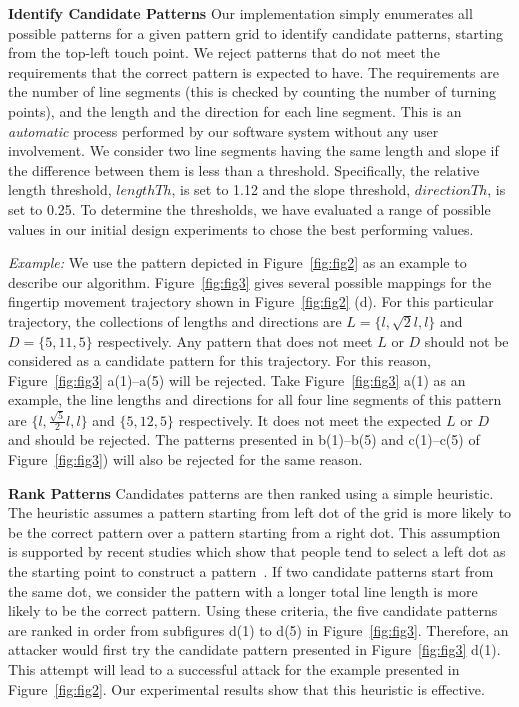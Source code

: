       \noindent \textbf{Identify Candidate Patterns} Our implementation simply enumerates all possible
        patterns for a given pattern grid to identify candidate patterns, starting from the top-left touch point.
        We reject patterns that do not meet the requirements that the correct pattern is expected to have. The requirements are the number of line segments (this is checked by counting the number of turning points), and the length and the direction for each
        line segment.
        This is an \emph{automatic} process performed by our software system without any user involvement.
       We consider two line segments having the same length and slope if the difference between them is less
       than a threshold. Specifically, the relative length threshold, $lengthTh$, is set to 1.12 and the slope threshold, $directionTh$, is set to 0.25.
       To determine the thresholds, we have evaluated a range of possible values in our initial design experiments to chose the best performing values.

       \noindent \emph{Example:} We use the pattern depicted in Figure~\ref{fig:fig2} as an example to
       describe our algorithm. Figure~\ref{fig:fig3} gives several
       possible mappings for the fingertip movement trajectory shown in Figure~\ref{fig:fig2} (d). For this particular trajectory, the collections of lengths and directions are
       $L=\{l, \sqrt{2}l, l\}$ and $D=\{5, 11, 5\}$ respectively. Any pattern that does not meet $L$ or $D$ should not be considered as a candidate pattern for this trajectory.
       For this reason, Figure~\ref{fig:fig3} a(1)--a(5) will be rejected. Take Figure~\ref{fig:fig3} a(1) as an example,
       the line lengths and directions for all four line segments of this pattern are  $\{l,
       \frac{\sqrt{5}}{2}l, l\}$ and $\{5,12,5\}$ respectively. It does not meet the expected $L$ or $D$ and should be rejected.
       The patterns presented in b(1)--b(5) and c(1)--c(5) of Figure~\ref{fig:fig3}) will
       also be rejected for the same reason.

        \noindent \textbf{Rank Patterns} Candidates patterns are then ranked using a simple
        heuristic. The heuristic assumes a pattern starting from
        left dot of the grid is more likely to be the correct pattern over a
         pattern starting from a right dot. This assumption is supported
        by recent studies which show that people tend to select a left dot as the starting point
        to construct a pattern~\cite{uellenbeck2013quantifying,alpnorway}.
         If two candidate patterns
         start from the same dot, we consider the pattern with a
        longer total line length
        is more likely to be the correct pattern. Using these criteria,
        the five candidate patterns are ranked in order from subfigures d(1) to d(5) in
        Figure~\ref{fig:fig3}. Therefore, an attacker would first try the candidate
        pattern presented in Figure~\ref{fig:fig3} d(1).  This attempt will lead to a
        successful attack for the example presented in Figure~\ref{fig:fig2}. Our experimental results show that
        this heuristic is effective.



